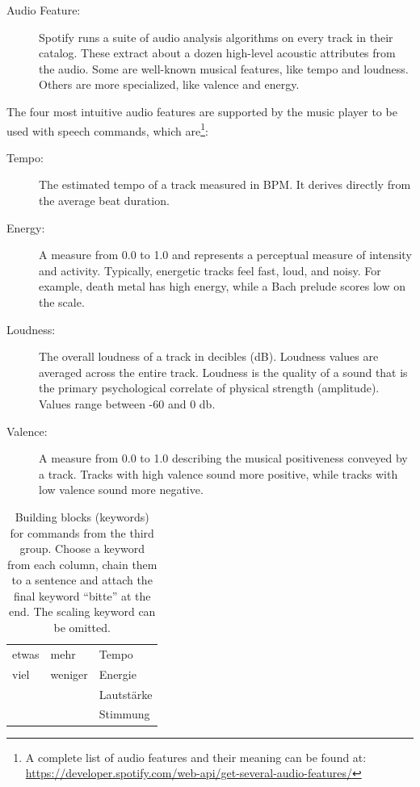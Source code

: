\begin{description}
	\item[Audio Feature:] Spotify runs a suite of audio analysis algorithms on every track in their catalog. These extract about a dozen high-level acoustic attributes from the audio. Some are well-known musical features, like tempo and loudness. Others are more specialized, like valence and energy.
\end{description}

The four most intuitive audio features are supported by the music player to be used with speech commands, which are\footnote{A complete list of audio features and their meaning can be found at: \url{https://developer.spotify.com/web-api/get-several-audio-features/}}:
\begin{description}
	\item[Tempo:]The estimated tempo of a track measured in \ac{BPM}. It derives directly from the average beat duration.
	\item[Energy:]A measure from 0.0 to 1.0 and represents a perceptual measure of intensity and activity. Typically, energetic tracks feel fast, loud, and noisy. For example, death metal has high energy, while a Bach prelude scores low on the scale.
	\item[Loudness:]The overall loudness of a track in decibles (dB). Loudness values are averaged across the entire track. Loudness is the quality of a sound that is the primary psychological correlate of physical strength (amplitude). Values range between -60 and 0 db.
	\item[Valence:]A measure from 0.0 to 1.0 describing the musical positiveness conveyed by a track. Tracks with high valence sound more positive, while tracks with low valence sound more negative.
\end{description}

\begin{table}[h]
	\myfloatalign
	\begin{tabularx}{\textwidth}{XXX} \toprule
		\tableheadline{Scaling} & \tableheadline{Direction} & \tableheadline{Audio Feature} \\ 
		\midrule
		etwas & mehr & Tempo \\
		viel & weniger & Energie \\
		 & & Lautst\"arke \\
		 & & Stimmung \\
		\bottomrule
	\end{tabularx}
	\caption{Building blocks (keywords) for commands from the third group. Choose a keyword from each column, chain them to a sentence and attach the final keyword ``bitte'' at the end. The scaling keyword can be omitted.}
	\label{tab:speechCommandsAudioFeature}
\end{table}


